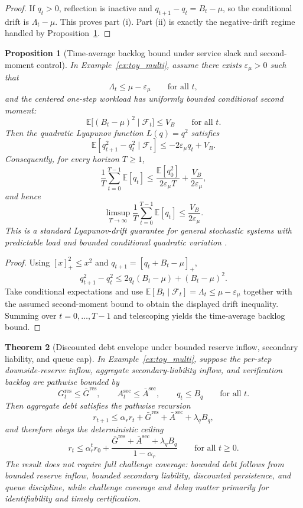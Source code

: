 \documentclass[11pt]{article}
\newtheorem{theorem}{Theorem}[section]
\newtheorem{proposition}[theorem]{Proposition}
\theoremstyle{definition}
\newcommand{\E}{\mathbb{E}}
\newcommand{\1}{\mathbf{1}}
\newcommand{\eps}{\varepsilon}
\begin{document}
\begin{proof}
If $q_t>0$, reflection is inactive and $q_{t+1}-q_t=B_t-\mu$, so the conditional drift is $\Lambda_t-\mu$. This proves part (i). Part (ii) is exactly the negative-drift regime handled by Proposition~\ref{prop:queue_first_moment}.
\end{proof}


\begin{proposition}[Time-average backlog bound under service slack and second-moment control]\label{prop:queue_first_moment}
In Example~\ref{ex:toy_multi}, assume there exists $\eps_\mu>0$ such that
\[
\Lambda_t\le \mu-\eps_\mu
\qquad\text{for all }t,
\]
and the centered one-step workload has uniformly bounded conditional second moment:
\[
\E\bigl[(B_t-\mu)^2\mid \mathcal F_t\bigr]\le V_B
\qquad\text{for all }t.
\]
Then the quadratic Lyapunov function $L(q)=q^2$ satisfies
\[
\E[q_{t+1}^2-q_t^2\mid \mathcal F_t]\le -2\eps_\mu q_t + V_B.
\]
Consequently, for every horizon $T\ge1$,
\[
\frac1T\sum_{t=0}^{T-1}\E[q_t]
\le
\frac{\E[q_0^2]}{2\eps_\mu T}+\frac{V_B}{2\eps_\mu},
\]
and hence
\[
\limsup_{T\to\infty}\frac1T\sum_{t=0}^{T-1}\E[q_t]
\le
\frac{V_B}{2\eps_\mu}.
\]
This is a standard Lyapunov-drift guarantee for general stochastic systems with predictable load and bounded conditional quadratic variation \cite{Neely2010}.
\end{proposition}

\begin{proof}
Using $[x]_+^2\le x^2$ and $q_{t+1}=[q_t+B_t-\mu]_+$,
\[
q_{t+1}^2-q_t^2
\le
2q_t(B_t-\mu)+(B_t-\mu)^2.
\]
Take conditional expectations and use $\E[B_t\mid\mathcal F_t]=\Lambda_t\le \mu-\eps_\mu$ together with the assumed second-moment bound to obtain the displayed drift inequality. Summing over $t=0,\dots,T-1$ and telescoping yields the time-average backlog bound.
\end{proof}
\begin{theorem}[Discounted debt envelope under bounded reserve inflow, secondary liability, and queue cap]\label{thm:shadow_debt}
In Example~\ref{ex:toy_multi}, suppose the per-step downside-reserve inflow, aggregate secondary-liability inflow, and verification backlog are pathwise bounded by
\[
G_t^{\mathrm{res}}\le \bar G^{\mathrm{res}},
\qquad
A_t^{\mathrm{sec}}\le \bar A^{\mathrm{sec}},
\qquad
q_t\le B_q
\qquad\text{for all }t.
\]
Then aggregate debt satisfies the pathwise recursion
\[
r_{t+1}\le \alpha_r r_t + \bar G^{\mathrm{res}} + \bar A^{\mathrm{sec}} + \lambda_q B_q,
\]
and therefore obeys the deterministic ceiling
\[
r_t
\le
\alpha_r^t r_0 + \frac{\bar G^{\mathrm{res}} + \bar A^{\mathrm{sec}} + \lambda_q B_q}{1-\alpha_r}
\qquad\text{for all }t\ge0.
\]
The result does not require full challenge coverage: bounded debt follows from bounded reserve inflow, bounded secondary liability, discounted persistence, and queue discipline, while challenge coverage and delay matter primarily for identifiability and timely certification.
\end{theorem}
\end{document}
